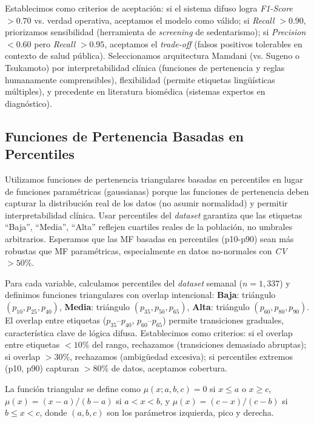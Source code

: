 Establecimos como criterios de aceptación: si el sistema difuso logra \textit{F1-Score} $> 0.70$ vs. verdad operativa, aceptamos el modelo como válido; si \textit{Recall} $> 0.90$, priorizamos sensibilidad (herramienta de \textit{screening} de sedentarismo); si \textit{Precision} $< 0.60$ pero \textit{Recall} $> 0.95$, aceptamos el \textit{trade-off} (falsos positivos tolerables en contexto de salud pública). Seleccionamos arquitectura Mamdani (vs. Sugeno o Tsukamoto) por interpretabilidad clínica (funciones de pertenencia y reglas humanamente comprensibles), flexibilidad (permite etiquetas lingüísticas múltiples), y precedente en literatura biomédica (sistemas expertos en diagnóstico).

\subsection{Funciones de Pertenencia Basadas en Percentiles}

Utilizamos funciones de pertenencia triangulares basadas en percentiles en lugar de funciones paramétricas (gaussianas) porque las funciones de pertenencia deben capturar la distribución real de los datos (no asumir normalidad) y permitir interpretabilidad clínica. Usar percentiles del \textit{dataset} garantiza que las etiquetas ``Baja'', ``Media'', ``Alta'' reflejen cuartiles reales de la población, no umbrales arbitrarios. Esperamos que las MF basadas en percentiles (p10-p90) sean más robustas que MF paramétricas, especialmente en datos no-normales con \textit{CV} $> 50\%$.

Para cada variable, calculamos percentiles del \textit{dataset} semanal ($n=1,337$) y definimos funciones triangulares con overlap intencional: \textbf{Baja}: triángulo $(p_{10}, p_{25}, p_{40})$, \textbf{Media}: triángulo $(p_{35}, p_{50}, p_{65})$, \textbf{Alta}: triángulo $(p_{60}, p_{80}, p_{90})$. El overlap entre etiquetas ($p_{35}$--$p_{40}$, $p_{60}$--$p_{65}$) permite transiciones graduales, característica clave de lógica difusa. Establecimos como criterios: si el overlap entre etiquetas $< 10\%$ del rango, rechazamos (transiciones demasiado abruptas); si overlap $> 30\%$, rechazamos (ambigüedad excesiva); si percentiles extremos (p10, p90) capturan $> 80\%$ de datos, aceptamos cobertura.

La función triangular se define como $\mu(x; a, b, c) = 0$ si $x \leq a$ o $x \geq c$, $\mu(x) = (x-a)/(b-a)$ si $a < x < b$, y $\mu(x) = (c-x)/(c-b)$ si $b \leq x < c$, donde $(a, b, c)$ son los parámetros izquierda, pico y derecha.

